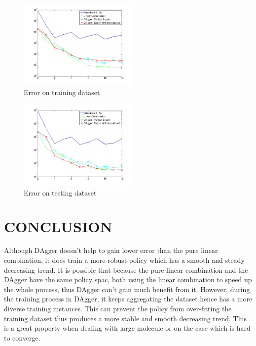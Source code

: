 \documentclass[twoside]{article}
\begin{document}
\begin{figure}[h!]
  \caption{Error on training dataset}
	\label{fig:training}
    \includegraphics[width=220px]{Dagger_beta05_training.png}
\end{figure}

\begin{figure}[h!]

  \caption{Error on testing dataset}
  \label{fig:testing}
    \includegraphics[width=220px]{Dagger_beta05_testing.png}
\end{figure}


\section{CONCLUSION}

Although DAgger doesn't help to gain lower error than the pure linear combination, it does train a more robust policy which has a smooth and steady decreasing trend. It is possible that because the pure linear combination and the DAgger have the same policy spac, both using the linear combination to speed up the whole process, thus DAgger can't gain much benefit from it. However, during the training process in DAgger, it keeps aggregating the dataset hence has a more diverse training instances. This can prevent the policy from over-fitting the training dataset thus produces a more stable and smooth decreasing trend. This is a great property when dealing with large molecule or on the case which is hard to converge.
\end{document}
